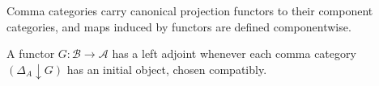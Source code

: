 \begin{remark}
\label{rem:lbc-comma-functoriality}
Comma categories carry canonical projection functors to their component
categories, and maps induced by functors are defined componentwise.
\end{remark}

\begin{corollary}
\label{cor:lbc-left-adjoint-criterion}
A functor $G:\mathcal B\to\mathcal A$ has a left adjoint whenever each comma
category $(\Delta_A\downarrow G)$ has an initial object, chosen compatibly.
\end{corollary}
